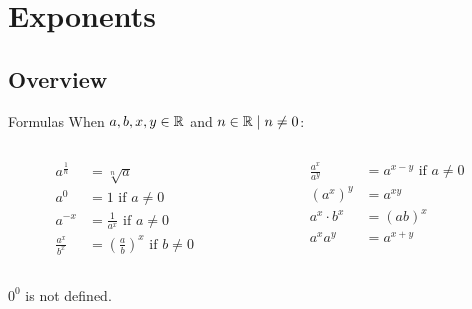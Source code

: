 \section{Exponents}
\subsection{Overview}
\begin{namedframe}{Formulas}
	When $a, b, x, y \in \mathbb{R}$ and $n \in \mathbb{R} \mid n \neq 0$:
	\begin{columns}
		\begin{column}{0.5\textwidth}
			\begin{align*}
				a^{\frac{1}{n}} &= \sqrt[n]{a}\\
				a^0             &= 1 \text{ if } a \neq 0\\
				a^{-x}          &= \frac{1}{a^x} \text{ if } a \neq 0\\
				\frac{a^x}{b^x} &= \left( \frac{a}{b} \right)^x \text{ if } b \neq 0
			\end{align*}
		\end{column}
		\begin{column}{0.5\textwidth}
			\begin{align*}
				\frac{a^x}{a^y}       &= a^{x-y} \text{ if } a \neq 0\\
				\left( a^x \right)^ y &= a^{xy}\\
				a^x \cdot b^x         &= (ab)^x\\
				a^x a^y               &= a^{x + y}
			\end{align*}
		\end{column}
	\end{columns}
	$0^0$ is not defined.
\end{namedframe}
